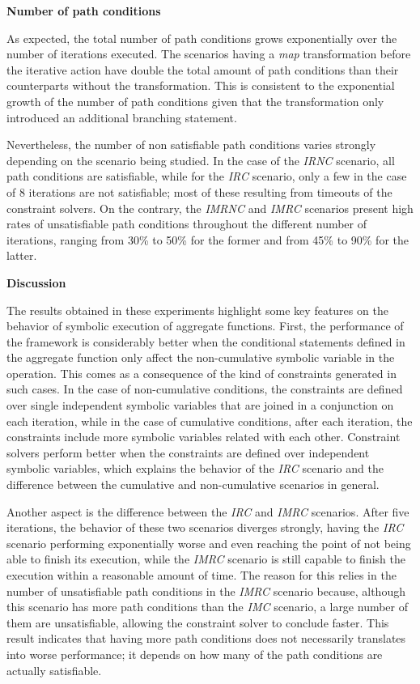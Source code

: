 \textbf{Number of path conditions}

As expected, the total number of path conditions grows exponentially over the number of iterations executed. The scenarios having a \textit{map} transformation before the iterative action have double the total amount of path conditions than their counterparts without the transformation. This is consistent to the exponential growth of the number of path conditions given that the transformation only introduced an additional branching statement.

Nevertheless, the number of non satisfiable path conditions varies strongly depending on the scenario being studied. In the case of the \textit{IRNC} scenario, all path conditions are satisfiable, while for the \textit{IRC} scenario, only a few in the case of 8 iterations are not satisfiable; most of these resulting from timeouts of the constraint solvers. On the contrary, the \textit{IMRNC} and \textit{IMRC} scenarios present high rates of unsatisfiable path conditions throughout the different number of iterations, ranging from 30\% to 50\% for the former and from 45\% to 90\% for the latter.

\textbf{Discussion}

The results obtained in these experiments highlight some key features on the behavior of symbolic execution of aggregate functions. First, the performance of the framework is considerably better when the conditional statements defined in the aggregate function only affect the non-cumulative symbolic variable in the operation. This comes as a consequence of the kind of constraints generated in such cases. In the case of non-cumulative conditions, the constraints are defined over single independent symbolic variables that are joined in a conjunction on each iteration, while in the case of cumulative conditions, after each iteration, the constraints include more symbolic variables related with each other. Constraint solvers perform better when the constraints are defined over independent symbolic variables, which explains the behavior of the \textit{IRC} scenario and the difference between the cumulative and non-cumulative scenarios in general.

Another aspect is the difference between the \textit{IRC} and \textit{IMRC} scenarios. After five iterations, the behavior of these two scenarios diverges strongly, having the \textit{IRC} scenario performing exponentially worse and even reaching the point of not being able to finish its execution, while the \textit{IMRC} scenario is still capable to finish the execution within a reasonable amount of time. The reason for this relies in the number of unsatisfiable path conditions in the \textit{IMRC} scenario because, although this scenario has more path conditions than the \textit{IMC} scenario, a large number of them are unsatisfiable, allowing the constraint solver to conclude faster. This result indicates that having more path conditions does not necessarily translates into worse performance; it depends on how many of the path conditions are actually satisfiable.

